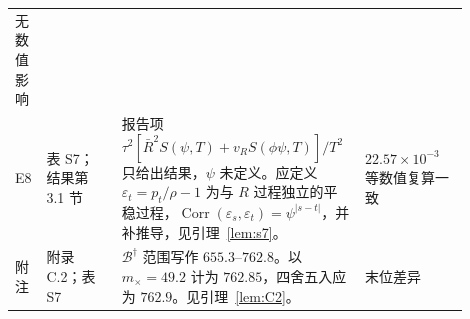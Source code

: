 \documentclass[fontset=none,11pt,a4paper,fleqn]{ctexart}
\numberwithin{equation}{section}
\theoremstyle{zhthm}
\theoremstyle{zhrem}
\newcommand{\Corr}{\operatorname{Corr}}
\newcommand{\Rbar}{\bar R}
\newcommand{\mx}{m_{\times}}
\begin{document}
\begin{small}
\begin{longtable}{@{}>{\raggedright\arraybackslash}p{0.055\linewidth}>{\raggedright\arraybackslash}p{0.16\linewidth}p{0.46\linewidth}>{\raggedright\arraybackslash}p{0.22\linewidth}@{}}
无数值影响 \\
\addlinespace
E8 & 表 S7；结果第 3.1 节 &
报告项 $\tau^2[\Rbar^2S(\psi,T)+v_RS(\phi\psi,T)]/T^2$ 只给出结果，$\psi$ 未定义。应定义 $\varepsilon_t=p_t/\rho-1$ 为与 $R$ 过程独立的平稳过程，$\Corr(\varepsilon_s,\varepsilon_t)=\psi^{\lvert s-t\rvert}$，并补推导，见引理~\ref{lem:s7}。 &
$22.57\times10^{-3}$ 等数值复算一致 \\
\addlinespace
附注 & 附录 C.2；表 S7 &
$\mathcal B^\dagger$ 范围写作 $655.3$--$762.8$。以 $\mx=49.2$ 计为 $762.85$，四舍五入应为 $762.9$。见引理~\ref{lem:C2}。 &
末位差异 \\
\end{longtable}
\end{small}

\nocite{*}
\FloatBarrier


\end{document}
